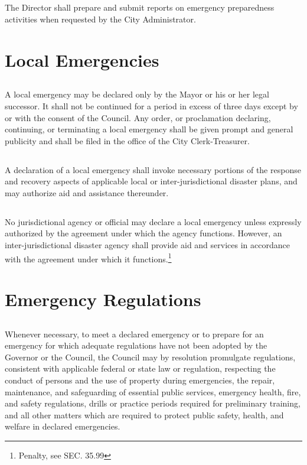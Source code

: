 \subsection{}
The Director shall prepare and submit reports on emergency preparedness activities when requested by the City Administrator.

\section{Local Emergencies}
\subsection{}
A local emergency may be declared only by the Mayor or his or her legal successor.   It shall not be continued for a period in excess of three days except by or with the consent of the Council. Any order, or proclamation declaring, continuing, or terminating a local emergency shall be given prompt and general publicity and shall be filed in the office of the City Clerk-Treasurer.
\subsection{}
A declaration of a local emergency shall invoke necessary portions of the response and recovery aspects of applicable local or inter-jurisdictional disaster plans, and may authorize aid and assistance thereunder.
\subsection{}
No jurisdictional agency or official may declare a local emergency unless expressly authorized by the agreement under which the agency functions. However, an inter-jurisdictional disaster agency shall provide aid and services in accordance with the agreement under which it functions.\footnote{Penalty, see SEC. 35.99}

\section{Emergency Regulations}
\subsection{}
Whenever necessary, to meet a declared emergency or to prepare for an emergency for which adequate regulations have not been adopted by the Governor or the Council, the Council may by resolution promulgate regulations, consistent with applicable federal or state law or regulation, respecting the conduct of persons and the use of property during emergencies, the repair, maintenance, and safeguarding of essential public services, emergency health, fire, and safety regulations, drills or practice periods required for preliminary training, and all other matters which are required to protect public safety, health, and welfare in declared emergencies.
